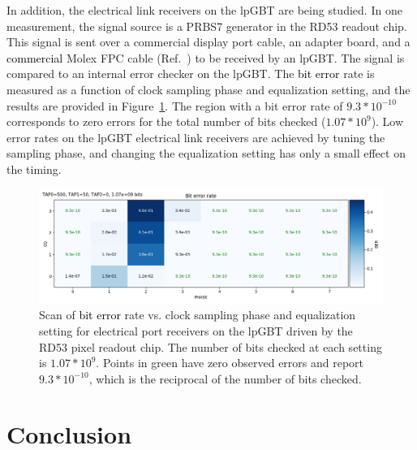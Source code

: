 \documentclass[a4paper,11pt]{article}
\newcommand{\fig}{Figure}
\newcommand{\black}{\textcolor{black}}
\begin{document}

In addition, the electrical link receivers on the lpGBT are being studied.
In one measurement, the signal source is a PRBS7 generator in the RD53 readout chip.
This signal is sent over a commercial display port cable, an adapter board, and a \black{commercial} Molex FPC cable (Ref.~\cite{ref:molex_cable}) to be received by an lpGBT.
The signal is compared to an internal error checker on the lpGBT.
The \black{bit error} rate is measured as a function of clock sampling phase and equalization setting, and the results are provided in \fig~\ref{fig:lpgbt_bert}.
The region with a bit error rate of $9.3 * 10^{-10}$ corresponds to zero errors for the total number of bits checked ($1.07 * 10^{9}$).
Low error rates on the lpGBT electrical link receivers are achieved by tuning the sampling phase, and changing the equalization setting has only a small effect on the timing.

\begin{figure}[htbp]
\centering
\includegraphics[width=1.0\textwidth,origin=c]{../figures/lpGBT_bert.png}
\caption{
\label{fig:lpgbt_bert}
Scan of \black{bit error} rate vs. clock sampling phase and equalization setting for electrical port receivers on the lpGBT driven by the RD53 pixel readout chip.
The number of bits checked at each setting is $1.07 * 10^{9}$.
Points in green have zero observed errors and report $9.3 * 10^{-10}$, which is the reciprocal of the number of bits checked.
}
\end{figure}

\section{Conclusion}
\label{sec:conclusion}
\end{document}
